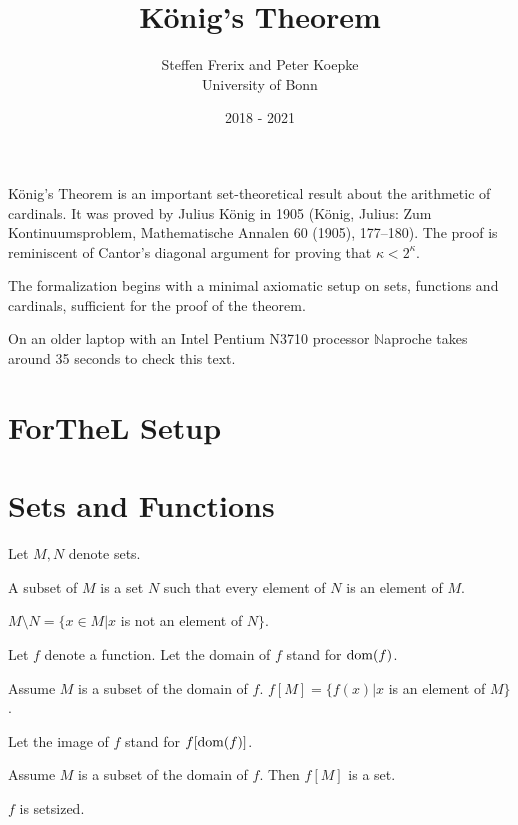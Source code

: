 \documentclass{article}
\title{König's Theorem}
\author{Steffen Frerix and Peter Koepke\\
University of Bonn}
\date{2018 - 2021}
\newcommand{\Naproche}{$\mathbb{N}$aproche}
\begin{document}
  \maketitle

König's Theorem is an important set-theoretical result about the
arithmetic of cardinals. It was proved by Julius König in 1905
(König, Julius: Zum Kontinuumsproblem, Mathematische Annalen 60 (1905), 177–180).
The proof is reminiscent of Cantor's diagonal argument for
proving that $\kappa < 2^\kappa$.

The formalization begins with a minimal axiomatic setup on sets, functions
and cardinals, sufficient for the proof of the theorem.

On an older laptop
with an Intel Pentium N3710 processor \Naproche{} takes
around 35 seconds to check this text.

\section{ForTheL Setup}

\begin{forthel}
\end{forthel}


\section{Sets and Functions}

\begin{forthel}
    Let $M,N$ denote sets.

    \begin{definition}
     A subset of $M$ is a set $N$ such that every element
     of $N$ is an element of $M$.
    \end{definition}

    \begin{definition}
      $M \setminus N = \{x \in M | x$ is not an element of $N\}$.
    \end{definition}

    Let $f$ denote a function.
    Let the domain of $f$ stand for $\operatorname{dom}(f)$.

    \begin{definition}
      Assume $M$ is a subset of the domain of $f$.
      $f[M] = \{f(x) | x$ is an element of $M\}$.
    \end{definition}

    Let the image of $f$ stand for $f[\operatorname{dom}(f)]$.

    \begin{axiom}
      Assume $M$ is a subset of the domain of $f$.
      Then $f[M]$ is a set.
    \end{axiom}

    \begin{axiom}
      $f$ is setsized.
    \end{axiom}
\end{forthel}
\end{document}
